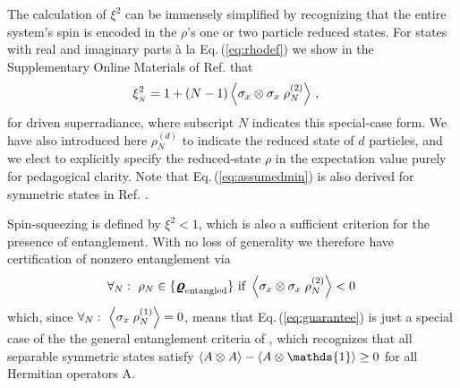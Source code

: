 \documentclass[
  12pt          %
  ,letterpaper  %
  ,center       %
  ,noupper      %
  ,english,fleqn]{uconnthesis}
\newcommand{\brackets}[1]{\lbrace{#1\rbrace}}
\newcommand {\id}[0]{\ensuremath{\mathds{1}}}
\newcommand{\ceq}[1]{Eq.\,(\ref{#1})}
\begin{document}
The calculation of \({\xi}^2\) can be immensely simplified by recognizing that the entire system's spin is encoded in the $\rho$'s one or two particle reduced states. For states with real and imaginary parts {\`a} la \ceq{eq:rhodef} we show in the Supplementary Online Materials of Ref. \cite{DrivenSuperrad} that
\begin{align}\label{eq:assumedmin}
\xi^2_{_N}&=1+\left(N-1\right)\Braket{\sigma_x \otimes \sigma_x \;\rho_N^{(2)}}\,,
\end{align}
for driven superradiance, where subscript $N$ indicates this special-case form. We have also introduced here $\rho_N^{(d)}$ to indicate the reduced state of $d$ particles, and we elect to explicitly specify the reduced-state $\rho$ in the expectation value purely for pedagogical clarity. Note that \ceq{eq:assumedmin} is also derived for symmetric states in Ref. \citep[Eq. (7)]{SymmetricSpinSqueezing}.

Spin-squeezing is defined by ${\xi^2<1}$, which is also a sufficient criterion for the presence of entanglement. With no loss of generality we therefore have certification of nonzero entanglement \cite{entang.review.toth,multireview,characterizingentanglement,SymmetricEquivalents,eckert2002quantum} via
\begin{align}\label{eq:guarantee}
\forall_N:\,\,\rho_N\in \brackets{\bm{\mbox{\large \(\varrho\)}}_\text{entangled}}\text{ if }\Braket{\sigma_x \otimes \sigma_x \;\rho_N^{(2)}}<0\,
\end{align}
which, since $\forall_N:\,\,\Braket{\sigma_x \;\rho_N^{(1)}}=0$, means that \ceq{eq:guarantee} is just a special case of the the general entanglement criteria of \cite[Eq. (33)]{RamseySpinSqueezing,SymmetricSpinSqueezing,SymmetricEquivalentsPRL,OptimalSpinSqueezingParameter}, which recognizes that all separable symmetric states satisfy $\Braket{A \otimes A}-\Braket{A \otimes \id} \geq 0$ for all Hermitian operators A.
\end{document}
